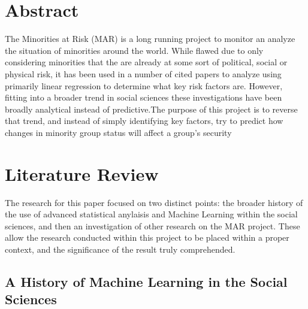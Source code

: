 \documentclass[12pt]{article}
\begin{document}

\newcommand{\hmwkClass}{CS 280}
\newcommand{\hmwkSemester}{Fall 2016}

\newcommand{\hmwkAuthorName}{Brendan Burgess}
\newcommand{\hmwkAuthorID}{brburgess}

\newcommand{\hmwkAssignmentNum}{4}

\newcommand{\hmwkProblemNum}{1}




\noindent

\section{Abstract}
The Minorities at Risk (MAR) is a long running project to monitor an analyze the situation of minorities around the world. While flawed due to only considering minorities that the are already at some sort of political, social or physical risk, it has been used in a number of cited papers to analyze using primarily linear regression to determine what key risk factors are. However, fitting into a broader trend in social sciences these investigations have been broadly analytical instead of predictive.The purpose of this project is to reverse that trend, and instead of simply identifying key factors, try to predict how changes in minority group status will affect a group's security

\section{Literature Review}

The research for this paper focused on two distinct points: the broader history of the use of advanced statistical anylaisis and Machine Learning within the social sciences, and then an investigation of other research on the MAR project. These allow the research conducted within this project to be placed within a proper context, and the significance of the result truly comprehended. 

\subsection{A History of Machine Learning in the Social Sciences}
\end{document}

